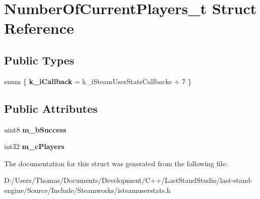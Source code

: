 \hypertarget{structNumberOfCurrentPlayers__t}{}\section{Number\+Of\+Current\+Players\+\_\+t Struct Reference}
\label{structNumberOfCurrentPlayers__t}
\subsection*{Public Types}
\begin{DoxyCompactItemize}
\item 
\hypertarget{structNumberOfCurrentPlayers__t_a7be86ef41e06574316139a560fb1ce47}{}enum \{ {\bfseries k\+\_\+i\+Callback} = k\+\_\+i\+Steam\+User\+Stats\+Callbacks + 7
 \}\label{structNumberOfCurrentPlayers__t_a7be86ef41e06574316139a560fb1ce47}

\end{DoxyCompactItemize}
\subsection*{Public Attributes}
\begin{DoxyCompactItemize}
\item 
\hypertarget{structNumberOfCurrentPlayers__t_a57ca566550ecbb229dd13e47ce580ffd}{}uint8 {\bfseries m\+\_\+b\+Success}\label{structNumberOfCurrentPlayers__t_a57ca566550ecbb229dd13e47ce580ffd}

\item 
\hypertarget{structNumberOfCurrentPlayers__t_a6c951e24d669dcacc9316a76f03504d7}{}int32 {\bfseries m\+\_\+c\+Players}\label{structNumberOfCurrentPlayers__t_a6c951e24d669dcacc9316a76f03504d7}

\end{DoxyCompactItemize}


The documentation for this struct was generated from the following file\+:\begin{DoxyCompactItemize}
\item 
D\+:/\+Users/\+Thomas/\+Documents/\+Development/\+C++/\+Last\+Stand\+Studio/last-\/stand-\/engine/\+Source/\+Include/\+Steamworks/isteamuserstats.\+h\end{DoxyCompactItemize}
